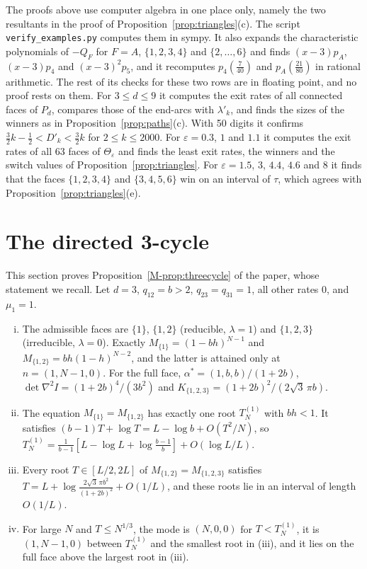 \documentclass[EJP,preprint]{ejpecp}
\newcommand{\mref}[1]{\ref*{M-#1}}
\begin{document}
The proofs above use computer algebra in one place only, namely the two
resultants in the proof of Proposition~\ref{prop:triangles}(c). The script
\texttt{verify\_examples.py} computes them in sympy. It also expands the
characteristic polynomials of $-Q_F$ for $F=A$, $\{1,2,3,4\}$ and
$\{2,\dots,6\}$ and finds $(x-3)p_A$, $(x-3)p_4$ and $(x-3)^2p_5$, and it
recomputes $p_4(\frac7{40})$ and $p_A(\frac{21}{80})$ in rational arithmetic.
The rest of its checks for these two rows are in floating point, and no proof
rests on them. For $3\le d\le9$ it computes the exit rates of all connected
faces of $P_d$, compares those of the end-arcs with $\lambda'_k$, and finds
the sizes of the winners as in Proposition~\ref{prop:paths}(c). With 50
digits it confirms $\frac32k-\frac12<D'_k<\frac32k$ for $2\le k\le2000$. For
$\varepsilon=0.3$, $1$ and $1.1$ it computes the exit rates of all 63 faces of
$\Theta_\varepsilon$ and finds the least exit rates, the winners and the
switch values of Proposition~\ref{prop:triangles}. For $\varepsilon=1.5$, $3$,
$4.4$, $4.6$ and $8$ it finds that the faces $\{1,2,3,4\}$ and $\{3,4,5,6\}$
win on an interval of $\tau$, which agrees with
Proposition~\ref{prop:triangles}(e).

\section{The directed 3-cycle}\label{supp:threecycle}

This section proves Proposition~\mref{prop:threecycle} of the paper, whose statement we
recall. Let $d=3$, $q_{12}=b>2$, $q_{23}=q_{31}=1$, all other rates $0$, and $\mu_1=1$.
\begin{enumerate}[(i)]
\item The admissible faces are $\{1\}$, $\{1,2\}$ (reducible, $\lambda=1$) and
$\{1,2,3\}$ (irreducible, $\lambda=0$). Exactly
$M_{\{1\}}=(1-bh)^{N-1}$ and $M_{\{1,2\}}=bh(1-h)^{N-2}$, and the latter is
attained only at $n=(1,N-1,0)$. For the full face,
$\alpha^*=(1,b,b)/(1+2b)$, $\det\nabla^2I=(1+2b)^4/(3b^2)$ and
$K_{\{1,2,3\}}=(1+2b)^2/(2\sqrt3\,\pi b)$.
\item The equation $M_{\{1\}}=M_{\{1,2\}}$ has exactly one root $T^{(1)}_N$ with $bh<1$. It
satisfies $(b-1)T+\log T=L-\log b+O(T^2/N)$, so
$T^{(1)}_N=\frac1{b-1}[L-\log L+\log\frac{b-1}b]+O(\log L/L)$.
\item Every root $T\in[L/2,2L]$ of $M_{\{1,2\}}=M_{\{1,2,3\}}$ satisfies
$T=L+\log\frac{2\sqrt3\,\pi b^2}{(1+2b)^2}+O(1/L)$, and these roots lie in an interval of
length $O(1/L)$.
\item For large $N$ and $T\le N^{1/3}$,
the mode is $(N,0,0)$ for $T<T^{(1)}_N$, it is $(1,N-1,0)$ between
$T^{(1)}_N$ and the smallest root in (iii), and it lies on the full face above
the largest root in (iii).
\end{enumerate}
\end{document}
